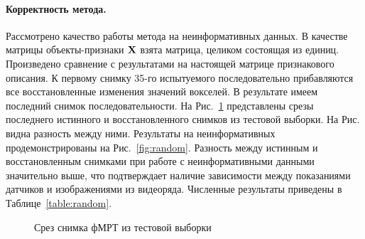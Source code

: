 \paragraph*{Корректность метода.}

Рассмотрено качество работы метода на неинформативных данных.
В качестве матрицы объекты-признаки $\mathbf{X}$ взята матрица, целиком состоящая из единиц.
Произведено сравнение с результатами на настоящей матрице признакового описания.
К первому снимку 35-го испытуемого последовательно прибавляются все восстановленные
изменения значений вокселей.
В результате имеем последний снимок последовательности. На Рис.~\ref*{fig:recover}
представлены срезы последнего истинного и восстановленного снимков из тестовой выборки.
На Рис. видна разность между ними.
Результаты на неинформативных продемонстрированы на Рис.~\ref{fig:random}.
Разность между истинным и восстановленным снимками при работе с неинформативными данными
значительно выше, что подтверждает наличие зависимости между показаниями датчиков и
изображениями из видеоряда. Численные результаты приведены в Таблице~\ref{table:random}.

\begin{figure}[h!]
	\centering
	\hfill
	\hfill
	\caption{Срез снимка фМРТ из тестовой выборки}
	\label{fig:recover}
\end{figure}

